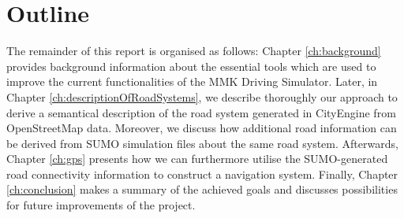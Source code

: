 \section{Outline}
\label{sec:outline}
The remainder of this report is organised as follows: Chapter \ref{ch:background} provides background information about the essential tools which are used to improve the current functionalities of the MMK Driving Simulator. Later, in Chapter \ref{ch:descriptionOfRoadSystems}, we describe thoroughly our approach to derive a semantical description of the road system generated in CityEngine from OpenStreetMap data. Moreover, we discuss how additional road information can be derived from SUMO simulation files about the same road system. Afterwards, Chapter \ref{ch:gps} presents how we can furthermore utilise the SUMO-generated road connectivity information to construct a navigation system. Finally, Chapter \ref{ch:conclusion} makes a summary of the achieved goals and discusses possibilities for future improvements of the project.  

